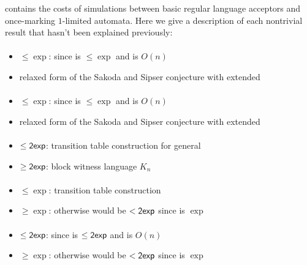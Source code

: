  contains the costs of simulations between basic regular language acceptors and once-marking $1$-limited automata.
Here we give a description of each nontrivial result that hasn't been explained previously:

\paragraph{\ONFA{}\tto\OMODLA}
\begin{itemize}
	\item $\le\exp$: since \hyperref[cost:1NFAto1DFA]{\ONFA{}\tto\ODFA} is $\le\exp$ and \ODFA{}\tto\OMODLA is $O(n)$
	\item relaxed form of the Sakoda and Sipser conjecture with extended \TDFA
\end{itemize}
\paragraph{\TNFA{}\tto\OMODLA}
\begin{itemize}
	\item $\le\exp$: since \hyperref[cost:2NFAto1DFA]{\TNFA{}\tto\ODFA} is $\le\exp$ and \ODFA{}\tto\OMODLA is $O(n)$
	\item relaxed form of the Sakoda and Sipser conjecture with extended \TDFA
\end{itemize}
\paragraph{\OMOLA{}\tto\ODFA}\label{cost:OM1LAto1DFA}
\begin{itemize}
	\item $\le\mathsf{2exp}$: transition table construction for general \OLA \cite{PigPis14}
	\item $\ge\mathsf{2exp}$: block witness language $K_n$ \cite{PigPri23a}
\end{itemize}
\paragraph{\OMOLA{}\tto\ONFA}\label{cost:OM1LAto1NFA}
\begin{itemize}
	\item $\le\exp$: transition table construction \cite{PigPis14}
	\item $\ge\exp$: otherwise \hyperref[cost:OM1LAto1DFA]{\OMOLA{}\tto\ODFA} would be $<\mathsf{2exp}$ since \hyperref[cost:1NFAto1DFA]{\ONFA{}\tto\ODFA} is $\exp$
\end{itemize}
\paragraph{\OMOLA{}\tto\TDFA}
\begin{itemize}
	\item $\le\mathsf{2exp}$: since \hyperref[cost:OM1LAto1DFA]{\OMOLA{}\tto\ODFA} is $\le\mathsf{2exp}$ and \ODFA{}\tto\TDFA is $O(n)$
	\item $\ge\exp$: otherwise \hyperref[cost:OM1LAto1DFA]{\OMOLA{}\tto\ODFA} would be $<\mathsf{2exp}$ since \hyperref[cost:2DFAto1DFA]{\TDFA{}\tto\ODFA} is $\exp$
\end{itemize}

